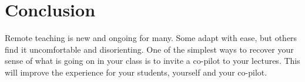 \documentclass[sigconf,natbib=false]{acmart}
\begin{document}
\section*{Conclusion}

Remote teaching is new and ongoing for many. Some adapt with ease, but others find it uncomfortable and disorienting. One of the simplest ways to recover your sense of what is going on in your class is to invite a co-pilot to your lectures. This will improve the experience for your students, yourself and your co-pilot.

\printbibliography
\end{document}
